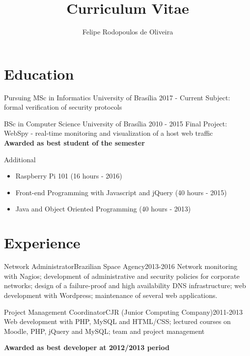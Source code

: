 \documentclass{cv}
\title{Curriculum Vitae}
\author{Felipe Rodopoulos de Oliveira}
\begin{document}
  \maketitle

  \section{Education}
  \begin{chronoitem}
    {Pursuing MSc in Informatics} {University of Brasília} {2017 - Current}
    Subject: formal verification of security protocols
  \end{chronoitem}

  \begin{chronoitem}
    {BSc in Computer Science} {University of Brasília} {2010 - 2015}
    Final Project: WebSpy - real-time monitoring and visualization of a host web traffic \\
    \textbf{Awarded as best student of the semester}
  \end{chronoitem}

  \begin{chronoitem}
    {Additional}{}{}
    \begin{itemize}
      \item[] Raspberry Pi 101 \hfill (16 hours - 2016)
      \item[] Front-end Programming with Javascript and jQuery \hfill (40 hours - 2015)
      \item[] Java and Object Oriented Programming \hfill (40 hours - 2013)
    \end{itemize}
  \end{chronoitem}
  \vspace{-.5cm}

  \section{Experience}
  \begin{chronoitem}
    {Network Administrator}{Brazilian Space Agency}{2013-2016}
    Network monitoring with Nagios; development of administrative and security policies for corporate networks; design of a failure-proof and high availability DNS infrastructure; web development with Wordpress; maintenance of several web applications.
  \end{chronoitem}

  \begin{chronoitem}
    {Project Management Coordinator}{CJR (Junior Computing Company)}{2011-2013}
    Web development with PHP, MySQL and HTML/CSS; lectured courses on Moodle, PHP, jQuery and MySQL; team and project management \par
    \textbf{Awarded as best developer at 2012/2013 period}
  \end{chronoitem}
  \vspace{-.5cm}
\end{document}
